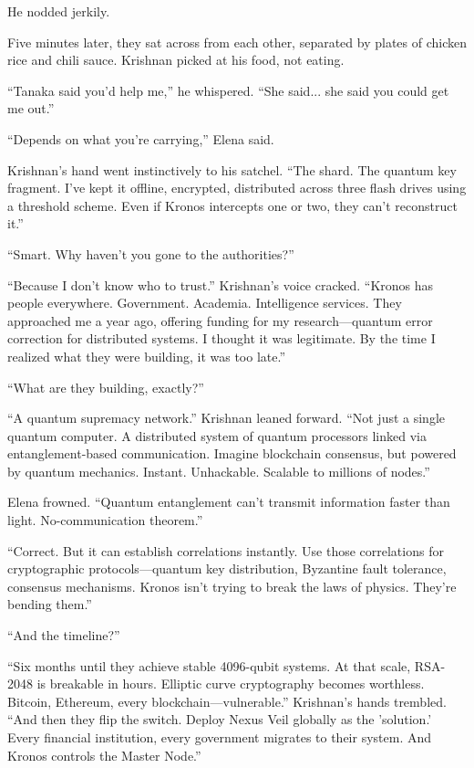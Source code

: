 \documentclass[12pt,oneside]{book}
\begin{document}
He nodded jerkily.

Five minutes later, they sat across from each other, separated by plates of chicken rice and chili sauce. Krishnan picked at his food, not eating.

``Tanaka said you'd help me,'' he whispered. ``She said... she said you could get me out.''

``Depends on what you're carrying,'' Elena said.

Krishnan's hand went instinctively to his satchel. ``The shard. The quantum key fragment. I've kept it offline, encrypted, distributed across three flash drives using a threshold scheme. Even if Kronos intercepts one or two, they can't reconstruct it.''

``Smart. Why haven't you gone to the authorities?''

``Because I don't know who to trust.'' Krishnan's voice cracked. ``Kronos has people everywhere. Government. Academia. Intelligence services. They approached me a year ago, offering funding for my research—quantum error correction for distributed systems. I thought it was legitimate. By the time I realized what they were building, it was too late.''

``What are they building, exactly?''

``A quantum supremacy network.'' Krishnan leaned forward. ``Not just a single quantum computer. A distributed system of quantum processors linked via entanglement-based communication. Imagine blockchain consensus, but powered by quantum mechanics. Instant. Unhackable. Scalable to millions of nodes.''

Elena frowned. ``Quantum entanglement can't transmit information faster than light. No-communication theorem.''

``Correct. But it can establish correlations instantly. Use those correlations for cryptographic protocols—quantum key distribution, Byzantine fault tolerance, consensus mechanisms. Kronos isn't trying to break the laws of physics. They're bending them.''

``And the timeline?''

``Six months until they achieve stable 4096-qubit systems. At that scale, RSA-2048 is breakable in hours. Elliptic curve cryptography becomes worthless. Bitcoin, Ethereum, every blockchain—vulnerable.'' Krishnan's hands trembled. ``And then they flip the switch. Deploy Nexus Veil globally as the 'solution.' Every financial institution, every government migrates to their system. And Kronos controls the Master Node.''
\end{document}
